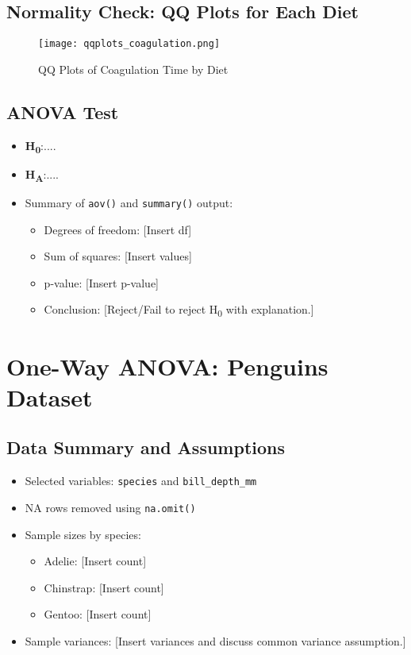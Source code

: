 \documentclass{article}
\begin{document}
\subsection{Normality Check: QQ Plots for Each Diet}
\begin{figure}[H]
    \centering
    \texttt{[image: qqplots\_coagulation.png]} %
    \caption{QQ Plots of Coagulation Time by Diet}
    \label{fig:coag_qq}
\end{figure}

\subsection{ANOVA Test}
\begin{itemize}
    \item \textbf{H\textsubscript{0}}:....
    \item \textbf{H\textsubscript{A}}:....
    \item Summary of \texttt{aov()} and \texttt{summary()} output:
    \begin{itemize}
        \item Degrees of freedom: [Insert df]
        \item Sum of squares: [Insert values]
        \item p-value: [Insert p-value]
        \item Conclusion: [Reject/Fail to reject H\textsubscript{0} with explanation.]
    \end{itemize}
\end{itemize}

\section{One-Way ANOVA: Penguins Dataset}

\subsection{Data Summary and Assumptions}
\begin{itemize}
    \item Selected variables: \texttt{species} and \texttt{bill\_depth\_mm}
    \item NA rows removed using \texttt{na.omit()}
    \item Sample sizes by species:
    \begin{itemize}
        \item Adelie: [Insert count]
        \item Chinstrap: [Insert count]
        \item Gentoo: [Insert count]
    \end{itemize}
    \item Sample variances: [Insert variances and discuss common variance assumption.]
\end{itemize}
\end{document}
